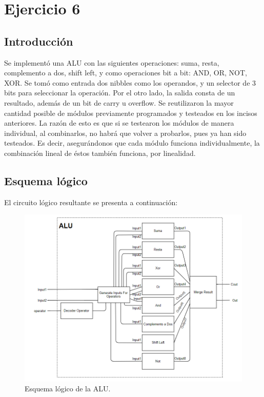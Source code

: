 \section{Ejercicio 6}
\subsection{Introducción}

Se implementó una ALU con las siguientes operaciones: suma, resta, complemento a dos, shift left, y como operaciones bit a bit: AND, OR, NOT, XOR.
Se tomó como entrada dos nibbles como los operandos, y un selector de 3 bits para seleccionar la operación. Por el otro lado, la salida consta de un resultado, además de un bit de carry u overflow.
Se reutilizaron la mayor cantidad posible de módulos previamente programados y testeados en los incisos anteriores. La razón de esto es que si se testearon los módulos de manera individual, al combinarlos, no habrá que volver a probarlos, pues ya han sido testeados. Es decir, asegurándonos que cada módulo funciona individualmente, la combinación lineal de éstos también funciona, por linealidad.

\subsection{Esquema lógico}
El circuito lógico resultante se presenta a continuación:
\begin{figure}[H]
    \begin{center}
        \caption{Esquema lógico de la ALU.}
		\includegraphics[scale=0.75]{esquemaALU.png}    
	\end{center}
\end{figure}
